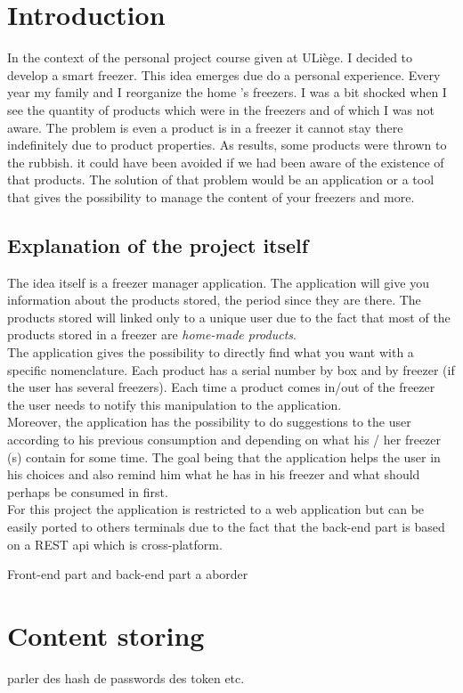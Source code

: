 \section{Introduction}
In the context of the personal project course given at ULiège. I decided to develop a smart freezer. This idea emerges due do a personal experience. Every year my family and I reorganize the home 's freezers. I was a bit shocked when I see the quantity of products which were in the freezers and of which I was not aware. The problem is even a product is in a freezer it cannot stay there indefinitely due to product properties. As results, some products were thrown to the rubbish. it could have been avoided if we had been aware of the existence of that products. The solution of that problem would be an application or a tool that gives the possibility to manage the content of your freezers and more.

\subsection{Explanation of the project itself}
The idea itself is a freezer manager application. The application will give you information about the products stored, the period since they are there. The products stored will linked only to a unique user due to the fact that most of the products stored in a freezer are \textit{home-made products}.\\
The application gives the possibility to directly find what you want with a specific nomenclature. Each product has a serial number by box and by freezer (if the user has several freezers). Each time a product comes in/out of the freezer the user needs to notify this manipulation to the application.\\
Moreover, the application has the possibility to do suggestions to the user according to his previous consumption and depending on what his / her freezer (s) contain for some time. The goal being that the application helps the user in his choices and also remind him what he has in his freezer and what should perhaps be consumed in first. \\

For this project the application is restricted to a web application but can be easily ported to others terminals due to the fact that the back-end part is based on a REST api which is cross-platform.

Front-end part and back-end part a aborder
\section{Content storing}
parler des hash de passwords des token etc.
